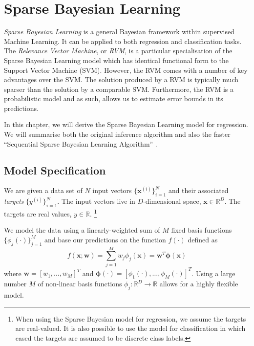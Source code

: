 
\chapter{Sparse Bayesian Learning}
\label{ch:rvm}
\emph{Sparse Bayesian Learning} \cite{tipping2001} is a general Bayesian framework within supervised Machine Learning. 
It can be applied to both regression and classification tasks.
The \emph{Relevance Vector Machine}, or \emph{RVM}, is a particular specialisation of the Sparse Bayesian Learning model which has identical functional form to the Support Vector Machine (SVM).
However, the RVM comes with a number of key advantages over the SVM. 
The solution produced by a RVM is typically much sparser than the solution by a comparable SVM.
Furthermore, the RVM is a probabilistic model and as such, allows us to estimate error bounds in its predictions.

In this chapter, we will derive the Sparse Bayesian Learning model for regression.
We will summarise both the original inference algorithm \cite{tipping2001} and also the faster ``Sequential Sparse Bayesian Learning Algorithm'' \cite{tipping2003}.

\section{Model Specification}
We are given a data set of $N$ input vectors $\{\bm x^{(i)}\}^N_{i=1}$ and their associated \emph{targets} $\{y^{(i)}\}_{i=1}^N$.
The input vectors live in $D$-dimensional space, $\bm x \in \mathbb{R}^D$.
The targets are real values, $y \in \mathbb{R}$.
\footnote{When using the Sparse Bayesian model for regression, we assume the targets are real-valued.
  It is also possible to use the model for classification in which cased the targets are assumed to be discrete class labels.
}

We model the data using a linearly-weighted sum of $M$ fixed basis functions $\{\phi_j(\cdot)\}_{j=1}^M$ and base our predictions on the function $f(\cdot)$ defined as
\begin{equation} 
  \label{rvm:function}
  f(\bm x; \bm w) = \sum_{j=1}^M w_j \phi_j(\bm x) = \bm w^T \bm \phi(\bm x)
\end{equation}
where $\bm w = [w_1, \dots, w_M]^T$ and $\bm \phi(\cdot) = [\phi_1(\cdot), \dots, \phi_M(\cdot)]^T$.
Using a large number $M$ of non-linear basis functions $\phi_j : \mathbb{R}^D \to \mathbb{R}$ allows for a highly flexible model. 

